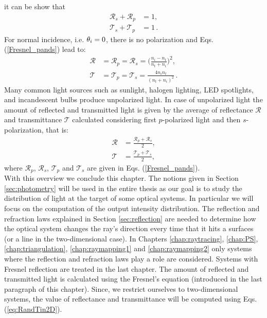 it can be show that
\begin{equation}
\begin{split}
\mathcal{R}_s+\mathcal{R}_p &= 1,\\
\mathcal{T}_s+\mathcal{T}_p &=1\,.
\end{split}
\end{equation}
For normal incidence, i.e. $\theta_i = 0$, there is no polarization and Eqs. (\ref{Fresnel_pands}) lead to:
\begin{equation}
\begin{split}
\mathcal{R} &= \mathcal{R}_p = \mathcal{R}_s = \Bigg(\frac{n_i-n_t}{n_t+n_i}\Bigg)^2, \\
\mathcal{T} &= \mathcal{T}_p = \mathcal{T}_s = \frac{4n_i n_t}{(n_t+n_i)^2}\,.
\end{split}
\end{equation}
\indent %
Many common light sources such as sunlight, halogen lighting, LED spotlights, and incandescent bulbs produce unpolarized light. 
In case of unpolarized light the amount of reflected and transmitted light is given by the average of reflectance $\mathcal{R}$ and transmittance $\mathcal{T}$ calculated considering first $p$-polarized light and then $s$-polarization, that is:
\begin{equation}\begin{split}
\mathcal{R} &= \frac{\mathcal{R}_p+ \mathcal{R}_s}{2},\\
\mathcal{T} &= \frac{\mathcal{T}_p+ \mathcal{T}_s}{2}, 
\end{split}
\label{eq:RandTin2D}
\end{equation}
 where $\mathcal{R}_p$, $\mathcal{R}_s$, $\mathcal{T}_p$ and $\mathcal{T}_s$ are given in Eqs. (\ref{Fresnel_pands}). \\
\indent With this overview we conclude this chapter. The notions given in Section \ref{sec:photometry} will be used in the entire thesis as our goal is to study the distribution of light at the target of some optical systems. In particular we will focus on the computation of the output intensity distribution. The reflection and refraction laws explained in Section \ref{sec:reflection} are needed to determine how the optical system changes the ray's direction every time that it hits a surfaces (or a line in the two-dimensional case). In Chapters \ref{chap:raytracing}, \ref{chap:PS}, \ref{chap:triangulation}, \ref{chap:raymapping1} and \ref{chap:raymapping2} only systems where the reflection and refraction laws play a role are considered. Systems with Fresnel reflection are treated in the last chapter. The amount of reflected and transmitted light is calculated using the Fresnel's equation (introduced in the last paragraph of this chapter). Since, we restrict ourselves to two-dimensional systems, the value of reflectance and transmittance will be computed using Eqs. (\ref{eq:RandTin2D}).
